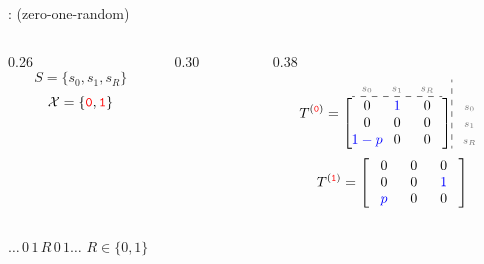 \documentclass[aspectratio=169,11pt]{beamer}
\newcommand{\uw}[1]{\underline{\smash{#1}}}
\newcommand{\ec}[1]{\makebox[2.15em]{\ensuremath{#1}}}          %
\newcommand{\lc}[1]{\makebox[2.15em]{\ensuremath{\scriptstyle\color{black!55}#1}}} %
\begin{document}
\begin{frame}
  \vspace{0.2em}
  \uw{Example 2}: \quad (zero-one-random)
  \begin{columns}[c]
    \begin{column}{0.26\textwidth}
      \[ S = \{s_0,s_1,s_R\} \]
      \[ \mathcal{X} = \{{\color{red}\mathtt{0}},{\color{red}\mathtt{1}}\} \]
    \end{column}
    \begin{column}{0.30\textwidth}
      \begin{center}\scalebox{0.72}{\figExTwoZOR}\end{center}
    \end{column}
    \begin{column}{0.38\textwidth}
      \[
        T^{({\color{red}\mathtt{0}})} =
        \begin{array}{@{}c@{}}
          \begin{array}{@{}c@{}c@{}c@{}}\lc{s_0}&\lc{s_1}&\lc{s_R}\\\hdashline\end{array}\\[0.1em]
          \left[\begin{array}{@{}c@{}c@{}c@{}}
            \ec{0} & \ec{\color{blue}1} & \ec{0}\\
            \ec{0} & \ec{0} & \ec{0}\\
            \ec{\color{blue}1-p} & \ec{0} & \ec{0}
          \end{array}\right]
        \end{array}
        \begin{array}{:@{\,}l@{}}\\[0.1em]\lc{s_0}\\ \lc{s_1}\\ \lc{s_R}\end{array}
      \]
      \vspace{-0.8em}
      \[
        T^{({\color{red}\mathtt{1}})} =
        \left[\begin{array}{@{}c@{}c@{}c@{}}
          \ec{0} & \ec{0} & \ec{0}\\
          \ec{0} & \ec{0} & \ec{\color{blue}1}\\
          \ec{\color{blue}p} & \ec{0} & \ec{0}
        \end{array}\right]
      \]
    \end{column}
  \end{columns}

  \vspace{0.1em}
  \hspace{1.5em}$\ldots\,0\,1\,R\,0\,1\ldots$
  \hspace{2em} $R \in \{0,1\}$
\end{frame}
\end{document}
